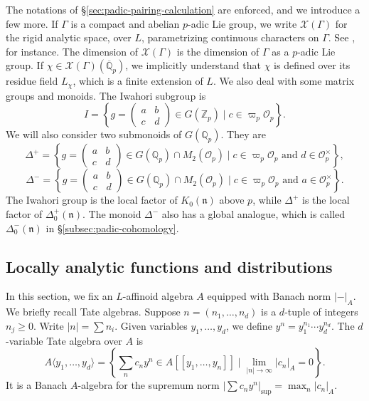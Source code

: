 \documentclass[10pt, twoside]{amsart}
\theoremstyle{plain}
\theoremstyle{definition}
\theoremstyle{remark}
\numberwithin{equation}{subsection}
\def\Q{\mathbb Q}
\def\Z{\mathbb Z}
\def\gn{\mathfrak n}
\def\scro{\mathscr O}
\def\scro{\mathscr O}
\def\scrx{\mathscr X}
\def\qpbar{\overline{\mathbb Q}_p}
\newcommand{\mat}[4]{\begin{pmatrix}#1&#2\\#3&#4\end{pmatrix}}
\begin{document}
The notations of \S \ref{sec:padic-pairing-calculation} are enforced, and we introduce a few more. If $\Gamma$ is a compact and abelian $p$-adic Lie group, we write $\scrx(\Gamma)$ for the rigid analytic space, over $L$, parametrizing continuous characters on $\Gamma$. See \cite[\S 5.1]{BH}, for instance. The dimension of $\scrx(\Gamma)$ is the dimension of $\Gamma$ as a $p$-adic Lie group. If $\chi \in \scrx(\Gamma)(\qpbar)$, we implicitly understand that $\chi$ is defined over its residue field $L_\chi$, which is a finite extension of $L$. We also deal with some matrix groups and monoids. The Iwahori subgroup is 
$$
I = \left\{g = \mat abcd\in G(\Z_p) \mid c \in \varpi_p \scro_p\right\}.
$$
We will also consider two submonoids of $G(\Q_p)$. They are
\begin{equation}\label{eqn:Delta+-defn}
\Delta^+ = \left\{ g = \mat abcd \in G(\Q_p) \cap M_2(\scro_p) \mid c \in \varpi_p\scro_p \text{ and } d \in \scro_p^\times\right\},
\end{equation}
\begin{equation}\label{eqn:Deltaminus-defn}
\Delta^- = \left\{ g = \mat abcd \in G(\Q_p) \cap M_2(\scro_p) \mid c \in \varpi_p\scro_p \text{ and } a \in \scro_p^\times\right\}.
\end{equation}
The Iwahori group is the local factor of $K_0(\gn)$ above $p$, while $\Delta^+$ is the local factor of $\Delta_0^+(\gn)$. The monoid $\Delta^-$ also has a global analogue, which is called $\Delta^-_0(\gn)$ in \S \ref{subsec:padic-cohomology}.

\subsection{Locally analytic functions and distributions}\label{subsec:distributions}

In this section, we fix an $L$-affinoid algebra $A$ equipped with Banach norm $|-|_A$. We briefly recall Tate algebras. Suppose $n = (n_1,\dotsc,n_d)$ is a $d$-tuple of integers $n_j \geq 0$. Write $|n| = \sum n_i$. Given variables $y_1,\dotsc,y_d$, we define $y^n = y_1^{n_1}\dotsb y_d^{n_d}$. The $d$-variable Tate algebra over $A$ is
$$
A \langle y_1,\dotsc,y_d \rangle = \left\{\sum_{n} c_n y^n \in A[[y_1,\dotsc,y_n]]\mid \lim_{|n|\rightarrow \infty} |c_n|_A = 0\right\}.
$$
It is a Banach $A$-algebra for the supremum norm $|\sum c_n y^n|_{\sup} = \max_n |c_n|_A$.
\end{document}
